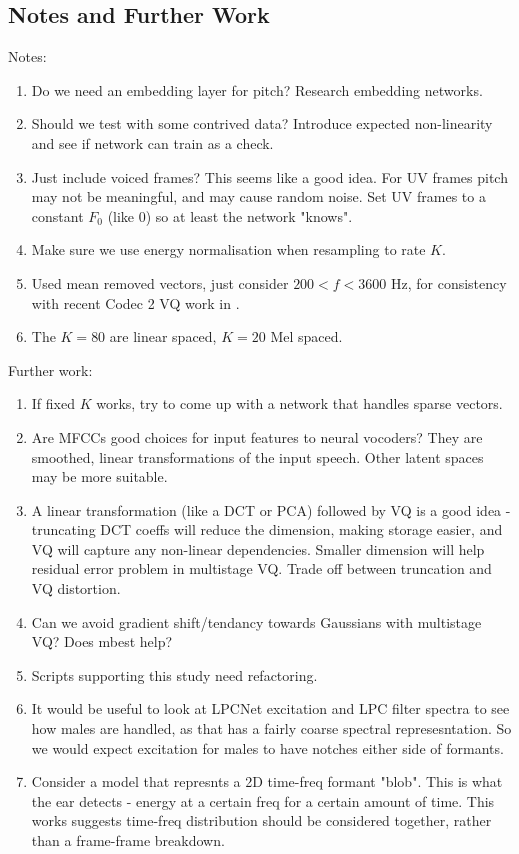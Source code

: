 \documentclass{article}
\begin{document}
\subsection{Notes and Further Work}

Notes:
\begin{enumerate}
\item Do we need an embedding layer for pitch?  Research embedding networks.
\item Should we test with some contrived data?  Introduce expected non-linearity and see if network can train as a check.
\item Just include voiced frames?  This seems like a good idea.  For UV frames pitch may not be meaningful, and may cause random noise. Set UV frames to a constant $F_0$ (like 0) so at least the network "knows".
\item Make sure we use energy normalisation \cite{rowe2023_ratek_study} when resampling to rate $K$.
\item Used mean removed vectors, just consider $200 < f < 3600$ Hz, for consistency with recent Codec 2 VQ work in \cite{rowe2023_ratek_study}.
\item The $K=80$ are linear spaced, $K=20$ Mel spaced.
\end{enumerate}

Further work:
\begin{enumerate}
\item If fixed $K$ works, try to come up with a network that handles sparse vectors.
\item Are MFCCs good choices for input features to neural vocoders? They are smoothed, linear transformations of the input speech.  Other latent spaces may be more suitable.
\item A linear transformation (like a DCT or PCA) followed by VQ is a good idea - truncating DCT coeffs will reduce the dimension, making storage easier, and VQ will capture any non-linear dependencies.  Smaller dimension will help residual error problem in multistage VQ. Trade off between truncation and VQ distortion.
\item Can we avoid gradient shift/tendancy towards Gaussians with multistage VQ?  Does mbest help?
\item Scripts supporting this study need refactoring.
\item It would be useful to look at LPCNet excitation and LPC filter spectra to see how males are handled, as that has a fairly coarse spectral represesntation.  So we would expect excitation for males to have notches either side of formants.
\item Consider a model that represnts a 2D time-freq formant "blob".  This is what the ear detects - energy at a certain freq for a certain amount of time.  This works suggests time-freq distribution should be considered together, rather than a frame-frame breakdown.
\end{enumerate}
\end{document}
